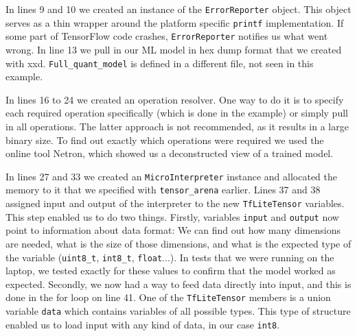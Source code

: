 In lines 9 and 10 we created an instance of the \verb|ErrorReporter| object.
This object serves as a thin wrapper around the platform specific \verb|printf| implementation.
If some part of TensorFlow code crashes, \verb|ErrorReporter| notifies us what went wrong.
In line 13 we pull in our ML model in hex dump format that we created with xxd.
\verb|Full_quant_model| is defined in a different file, not seen in this example.

In lines 16 to 24 we created an operation resolver.
One way to do it is to specify each required operation specifically (which is done in the example) or simply pull in all operations.
The latter approach is not recommended, as it results in a large binary size.
To find out exactly which operations were required we used the online tool Netron\cite{netron}, which showed us a deconstructed view of a trained model.

In lines 27 and 33 we created an \verb|MicroInterpreter| instance and allocated the memory to it that we specified with \verb|tensor_arena| earlier.
Lines 37 and 38 assigned input and output of the interpreter to the new \verb|TfLiteTensor| variables.
This step enabled us to do two things.
Firstly, variables \verb|input| and \verb|output| now point to information about data format: We can find out how many dimensions are needed, what is the size of those dimensions, and what is the expected type of the variable (\verb|uint8_t|, \verb|int8_t|, \verb|float|...).
In tests that we were running on the laptop, we tested exactly for these values to confirm that the model worked as expected.
Secondly, we now had a way to feed data directly into input, and this is done in the for loop on line 41.
One of the \verb|TfLiteTensor| members is a union variable \verb|data| which contains variables of all possible types.
This type of structure enabled us to load input with any kind of data, in our case \verb|int8|.



